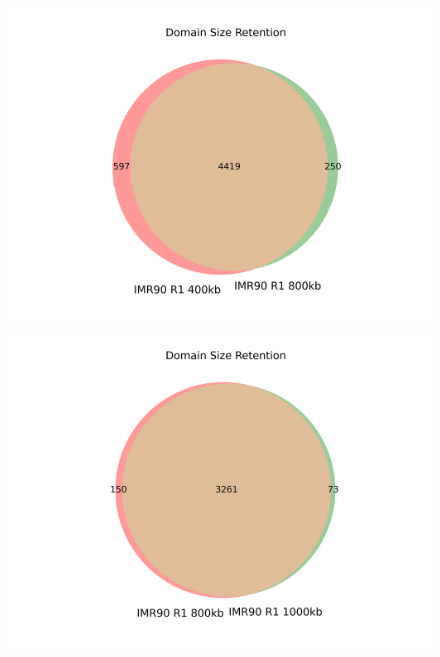 \begin{figure}[H]
  \begin{minipage}{0.45\textwidth}%
    \includegraphics[width=\textwidth]{./figures/supplementary/domains/venn2-IMR90-R1-400-vs-IMR90-R1-800.png}
  \end{minipage}%
  \hfill
  \begin{minipage}{0.45\textwidth}
    \centering
    \includegraphics[width=\textwidth]{./figures/supplementary/domains/venn2-IMR90-R1-800-vs-IMR90-R1-1000.png}
  \end{minipage}
\end{figure}
